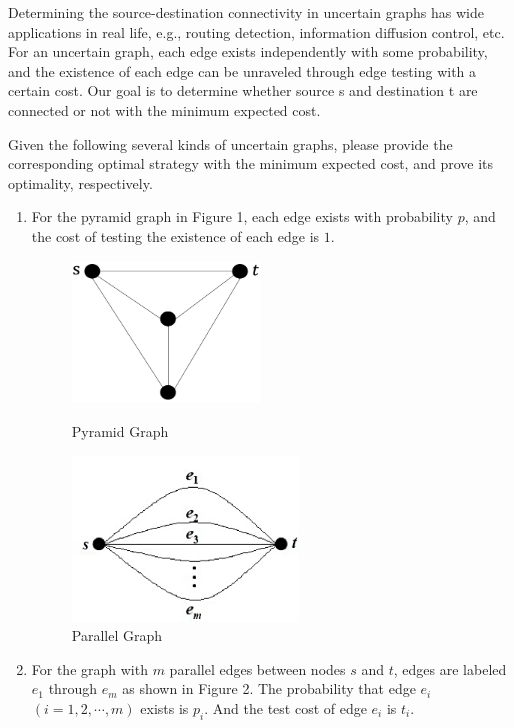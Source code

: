 \documentclass{oxmathproblems}
\begin{document}
\vspace{-15mm}
Determining the source-destination connectivity in uncertain graphs has wide applications in real life, e.g., routing detection, information diffusion control, etc. For an uncertain graph, each edge exists independently with some probability, and the existence of each edge can be unraveled through edge testing with a certain cost. Our goal is to determine whether source s and destination t are connected or not with the minimum expected cost.
	
Given the following several kinds of uncertain graphs, please provide the corresponding optimal strategy with the minimum expected cost, and prove its optimality, respectively.
\begin{enumerate}
\item For the pyramid graph in Figure 1, each edge exists with probability $p$, and the cost of testing the existence of each edge is $1$. 
\vspace{-5mm}
\begin{figure}[htbp]
\centering
\begin{minipage}[t]{0.3\textwidth}
\centering
\includegraphics[width=5cm]{1.png}
\caption{Pyramid Graph}
\end{minipage}
\begin{minipage}[t]{0.48\textwidth}
\centering
\includegraphics[width=6cm]{2.png}
\caption{Parallel Graph}
\end{minipage}
\end{figure}
\vspace{-5mm}
\item For the graph with $m$ parallel edges between nodes $s$ and $t$, edges are labeled $e_1$ through $e_m$ as shown in Figure 2. The probability that edge $e_i$ $(i=1,2,\cdots,m)$ exists is $p_i$. And the test cost of edge $e_i$ is $t_i$. 

\end{enumerate}
\end{document}

